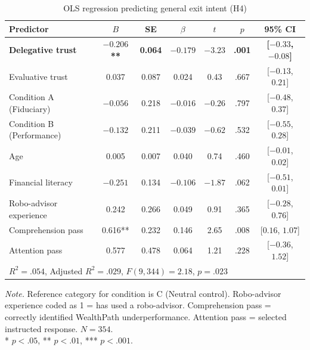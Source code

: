 \begin{table}[htbp]
\centering
\small
\caption{OLS regression predicting general exit intent (H4)}
\label{tab:reg_h4}
\begin{tabular}{lcccccc}
\toprule
Predictor & $B$ & SE & $\beta$ & $t$ & $p$ & 95\% CI \\
\midrule
\textbf{Delegative trust}    & \textbf{$-0.206$**} & \textbf{0.064} & \textbf{$-0.179$} & \textbf{$-3.23$} & \textbf{.001} & \textbf{[$-0.33$, $-0.08$]} \\
Evaluative trust              & 0.037                & 0.087          & 0.024              & 0.43              & .667 & [$-0.13$, $0.21$] \\
Condition A (Fiduciary)       & $-0.056$             & 0.218          & $-0.016$           & $-0.26$           & .797 & [$-0.48$, $0.37$] \\
Condition B (Performance)     & $-0.132$             & 0.211          & $-0.039$           & $-0.62$           & .532 & [$-0.55$, $0.28$] \\
Age                           & 0.005                & 0.007          & 0.040              & 0.74              & .460 & [$-0.01$, $0.02$] \\
Financial literacy            & $-0.251$             & 0.134          & $-0.106$           & $-1.87$           & .062 & [$-0.51$, $0.01$] \\
Robo-advisor experience       & 0.242                & 0.266          & 0.049              & 0.91              & .365 & [$-0.28$, $0.76$] \\
Comprehension pass            & 0.616**              & 0.232          & 0.146              & 2.65              & .008 & [$0.16$, $1.07$] \\
Attention pass                & 0.577                & 0.478          & 0.064              & 1.21              & .228 & [$-0.36$, $1.52$] \\
\midrule
\multicolumn{7}{l}{$R^2 = .054$, Adjusted $R^2 = .029$, $F(9, 344) = 2.18$, $p = .023$} \\
\bottomrule
\end{tabular}
\begin{flushleft}
\footnotesize
\textit{Note.} Reference category for condition is C (Neutral control). Robo-advisor experience coded as 1 = has used a robo-advisor. Comprehension pass = correctly identified WealthPath underperformance. Attention pass = selected instructed response. $N = 354$. \\
* $p < .05$, ** $p < .01$, *** $p < .001$.
\end{flushleft}
\end{table}

